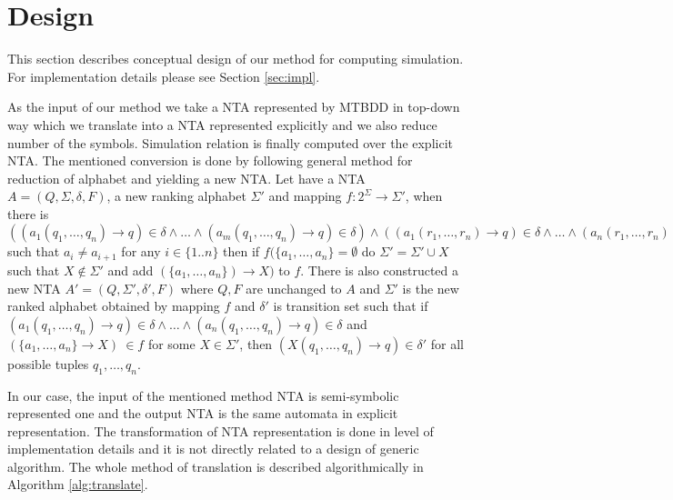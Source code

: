 \documentclass[a4paper, 12pt]{article}
\begin{document}
\section{Design}
\label{sec:design}

This section describes conceptual design of our method for computing simulation.
For implementation details please see Section \ref{sec:impl}.

As the input of our method we take a NTA represented by MTBDD in top-down way
which we translate into a NTA represented explicitly and we also reduce number of the symbols.
Simulation relation is finally computed over the explicit NTA.
The mentioned conversion is done by following general method for reduction of alphabet and yielding a new NTA.
Let have a NTA $A=(Q, \Sigma, \delta, F)$, a new ranking alphabet $\Sigma'$ and mapping $f: 2^\Sigma \rightarrow \Sigma'$,
when there is $((a_1(q_1,\ldots,q_n) \rightarrow q) \in \delta \wedge \ldots \wedge (a_m(q_1,\ldots,q_n) \rightarrow q) \in \delta) \wedge
((a_1(r_1,\ldots,r_n) \rightarrow q) \in \delta \wedge \ldots \wedge (a_n(r_1,\ldots,r_n) \rightarrow q) \in \delta)$
such that $a_i \neq a_{i+1}$ for any $i\in \{1..n\}$ then if $f(\{a_1,\ldots, a_n\} = \emptyset$ do $\Sigma' = \Sigma' \cup X$ such that $X \notin \Sigma'$
and add $(\{a_1, \ldots, a_n\}) \rightarrow X)$ to $f$.
There is also constructed a new NTA $A' = (Q, \Sigma', \delta', F)$ where $Q, F$ are unchanged to $A$ 
and $\Sigma'$ is the new ranked alphabet obtained by mapping $f$ and $\delta'$ is transition set such that
if $(a_1(q_1, \ldots, q_n) \rightarrow q) \in \delta \wedge \ldots \wedge (a_n(q_1, \ldots, q_n) \rightarrow q) \in \delta$ and
$ (\{a_1,\ldots,a_n\}  \rightarrow X)~\in f$ for some $X \in \Sigma'$, then $(X(q_1, \ldots, q_n) \rightarrow q) \in \delta'$
for all possible tuples $q_1,\ldots,q_n$.

In our case, the input of the mentioned method NTA is semi-symbolic represented one and the output NTA is the same automata in explicit representation.
The transformation of NTA representation is done in level of implementation details and it is not directly related to a design of generic algorithm.
The whole method of translation is described algorithmically in Algorithm \ref{alg:translate}.
\end{document}
